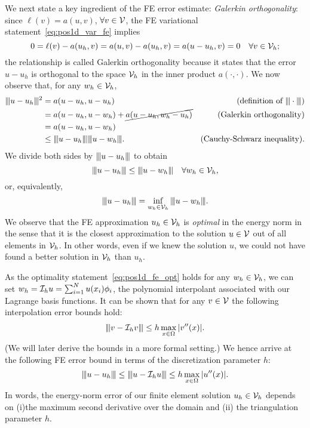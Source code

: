 We next state a key ingredient of the FE error estimate: \emph{Galerkin orthogonality}: since $\ell(v) = a(u,v)$, $\forall v \in \mathcal{V}$, the FE variational statement~\eqref{eq:pos1d_var_fe} implies
\begin{equation*}
  0 = \ell(v) - a(u_h,v) = a(u,v) - a(u_h,v) = a(u-u_h,v) = 0 \quad \forall v \in \mathcal{V}_h;
\end{equation*}
the relationship is called Galerkin orthogonality because it states that the error $u - u_h$ is orthogonal to the space $\mathcal{V}_h$ in the inner product $a(\cdot,\cdot)$. We now observe that, for any $w_h \in \mathcal{V}_h$,
\begin{align*}
  |\kern-1pt|\kern-1pt| u-u_h |\kern-1pt|\kern-1pt|^2
  &=
  a(u-u_h, u-u_h) & \text{(definition of $|\kern-1pt|\kern-1pt| \cdot |\kern-1pt|\kern-1pt|$)}
  \\
  &=
  a(u-u_h, u-w_h) + \cancel{ a(u-u_h,w_h - u_h) }
  & \text{(Galerkin orthogonality)}
  \\
  &=
  a(u-u_h, u - w_h) 
  \\
  &\leq  |\kern-1pt|\kern-1pt| u - u_h |\kern-1pt|\kern-1pt| |\kern-1pt|\kern-1pt| u - w_h |\kern-1pt|\kern-1pt|. & \text{(Cauchy-Schwarz inequality)}.
\end{align*}
We divide both sides by $|\kern-1pt|\kern-1pt| u - u_h |\kern-1pt|\kern-1pt|$ to obtain
\begin{equation}
  |\kern-1pt|\kern-1pt| u - u_h |\kern-1pt|\kern-1pt| \leq |\kern-1pt|\kern-1pt| u - w_h |\kern-1pt|\kern-1pt| \quad \forall w_h \in \mathcal{V}_h,
  \label{eq:pos1d_fe_opt}
\end{equation}
or, equivalently,
\begin{equation*}
  |\kern-1pt|\kern-1pt| u-u_h |\kern-1pt|\kern-1pt| = \inf_{w_h \in \mathcal{V}_h} |\kern-1pt|\kern-1pt| u - w_h |\kern-1pt|\kern-1pt|.
\end{equation*}
We observe that the FE approximation $u_h \in \mathcal{V}_h$ is \emph{optimal} in the energy norm in the sense that it is the closest approximation to the solution $u \in \mathcal{V}$ out of all elements in $\mathcal{V}_h$.  In other words, even if we knew the solution $u$, we could not have found a better solution in $\mathcal{V}_h$ than $u_h$.

As the optimality statement~\eqref{eq:pos1d_fe_opt} holds for any $w_h \in \mathcal{V}_h$, we can set $w_h = \mathcal{I}_h u = \sum_{i=1}^N u(x_i) \phi_i$, the polynomial interpolant associated with our Lagrange basis functions.  It can be shown that for any $v \in \mathcal{V}$ the following interpolation error bounds hold:
\begin{align*}
  |\kern-1pt|\kern-1pt|  v - \mathcal{I}_h v  |\kern-1pt|\kern-1pt| \leq h \max_{x \in \Omega} |v''(x) |.
\end{align*}
(We will later derive the bounds in a more formal setting.) We hence arrive at the following FE error bound in terms of the discretization parameter $h$:
\begin{equation*}
  |\kern-1pt|\kern-1pt| u - u_h |\kern-1pt|\kern-1pt| \leq |\kern-1pt|\kern-1pt| u - \mathcal{I}_h u |\kern-1pt|\kern-1pt| \leq h \max_{x \in \Omega}  | u''(x) |.
\end{equation*}
In words, the energy-norm error of our finite element solution $u_h \in \mathcal{V}_h$  depends on  (i)the maximum second derivative over the domain and (ii) the triangulation parameter $h$.

